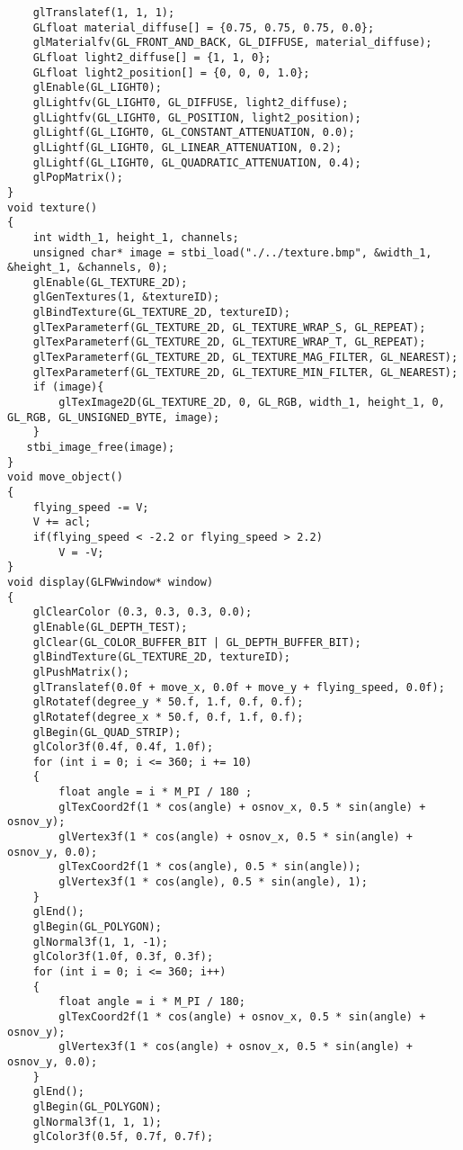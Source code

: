 \documentclass[a4paper, 14pt]{extarticle}
\begin{document}
\begin{verbatim}
    glTranslatef(1, 1, 1);
    GLfloat material_diffuse[] = {0.75, 0.75, 0.75, 0.0};
    glMaterialfv(GL_FRONT_AND_BACK, GL_DIFFUSE, material_diffuse);
    GLfloat light2_diffuse[] = {1, 1, 0};
    GLfloat light2_position[] = {0, 0, 0, 1.0};
    glEnable(GL_LIGHT0);
    glLightfv(GL_LIGHT0, GL_DIFFUSE, light2_diffuse);
    glLightfv(GL_LIGHT0, GL_POSITION, light2_position);
    glLightf(GL_LIGHT0, GL_CONSTANT_ATTENUATION, 0.0);
    glLightf(GL_LIGHT0, GL_LINEAR_ATTENUATION, 0.2);
    glLightf(GL_LIGHT0, GL_QUADRATIC_ATTENUATION, 0.4);
    glPopMatrix();
}
void texture()
{
    int width_1, height_1, channels;
    unsigned char* image = stbi_load("./../texture.bmp", &width_1, &height_1, &channels, 0);
    glEnable(GL_TEXTURE_2D);
    glGenTextures(1, &textureID);
    glBindTexture(GL_TEXTURE_2D, textureID);
    glTexParameterf(GL_TEXTURE_2D, GL_TEXTURE_WRAP_S, GL_REPEAT);
    glTexParameterf(GL_TEXTURE_2D, GL_TEXTURE_WRAP_T, GL_REPEAT);
    glTexParameterf(GL_TEXTURE_2D, GL_TEXTURE_MAG_FILTER, GL_NEAREST);
    glTexParameterf(GL_TEXTURE_2D, GL_TEXTURE_MIN_FILTER, GL_NEAREST);
    if (image){
        glTexImage2D(GL_TEXTURE_2D, 0, GL_RGB, width_1, height_1, 0, GL_RGB, GL_UNSIGNED_BYTE, image);
    }
   stbi_image_free(image);
}
void move_object()
{
    flying_speed -= V;
    V += acl;
    if(flying_speed < -2.2 or flying_speed > 2.2)
        V = -V;
}
void display(GLFWwindow* window)
{
    glClearColor (0.3, 0.3, 0.3, 0.0);
    glEnable(GL_DEPTH_TEST);
    glClear(GL_COLOR_BUFFER_BIT | GL_DEPTH_BUFFER_BIT);
    glBindTexture(GL_TEXTURE_2D, textureID);
    glPushMatrix();
    glTranslatef(0.0f + move_x, 0.0f + move_y + flying_speed, 0.0f);
    glRotatef(degree_y * 50.f, 1.f, 0.f, 0.f);
    glRotatef(degree_x * 50.f, 0.f, 1.f, 0.f);
    glBegin(GL_QUAD_STRIP);
    glColor3f(0.4f, 0.4f, 1.0f);
    for (int i = 0; i <= 360; i += 10)
    {
        float angle = i * M_PI / 180 ;
        glTexCoord2f(1 * cos(angle) + osnov_x, 0.5 * sin(angle) + osnov_y);
        glVertex3f(1 * cos(angle) + osnov_x, 0.5 * sin(angle) + osnov_y, 0.0);
        glTexCoord2f(1 * cos(angle), 0.5 * sin(angle));
        glVertex3f(1 * cos(angle), 0.5 * sin(angle), 1);
    }
    glEnd();
    glBegin(GL_POLYGON);
    glNormal3f(1, 1, -1);
    glColor3f(1.0f, 0.3f, 0.3f);
    for (int i = 0; i <= 360; i++)
    {
        float angle = i * M_PI / 180;
        glTexCoord2f(1 * cos(angle) + osnov_x, 0.5 * sin(angle) + osnov_y);
        glVertex3f(1 * cos(angle) + osnov_x, 0.5 * sin(angle) + osnov_y, 0.0);
    }
    glEnd();
    glBegin(GL_POLYGON);
    glNormal3f(1, 1, 1);
    glColor3f(0.5f, 0.7f, 0.7f);

\end{verbatim}
\end{document}
